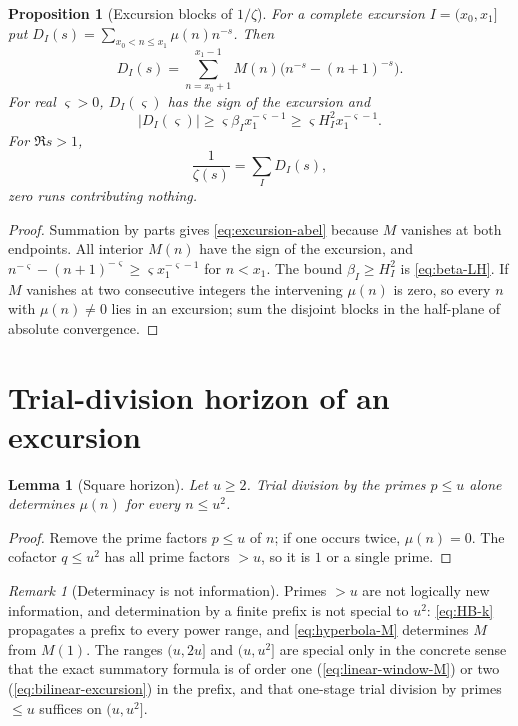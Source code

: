 \documentclass[11pt]{amsart}
\numberwithin{equation}{section}
\theoremstyle{plain}
\newtheorem{proposition}[theorem]{Proposition}
\newtheorem{lemma}[theorem]{Lemma}
\theoremstyle{definition}
\theoremstyle{remark}
\newtheorem{remark}[theorem]{Remark}
\begin{document}
\begin{proposition}[Excursion blocks of $1/\zeta$]
\label{prop:excursion-mellin}
For a complete excursion $I=(x_0,x_1]$ put
$D_I(s)=\sum_{x_0<n\le x_1}\mu(n)n^{-s}$. Then
\begin{equation}
\label{eq:excursion-abel}
D_I(s)=\sum_{n=x_0+1}^{x_1-1}M(n)
\bigl(n^{-s}-(n+1)^{-s}\bigr).
\end{equation}
For real $\varsigma>0$, $D_I(\varsigma)$ has the sign of the excursion and
\begin{equation}
\label{eq:excursion-mass-lower}
|D_I(\varsigma)|\ge
\varsigma\beta_I x_1^{-\varsigma-1}
\ge\varsigma H_I^2x_1^{-\varsigma-1}.
\end{equation}
For $\Re s>1$,
\begin{equation}
\label{eq:1overzeta-excursions}
\frac1{\zeta(s)}=\sum_I D_I(s),
\end{equation}
zero runs contributing nothing.
\end{proposition}

\begin{proof}
Summation by parts gives \eqref{eq:excursion-abel} because $M$ vanishes at
both endpoints. All interior $M(n)$ have the sign of the excursion, and
$n^{-\varsigma}-(n+1)^{-\varsigma}\ge\varsigma x_1^{-\varsigma-1}$ for $n<x_1$. The
bound $\beta_I\ge H_I^2$ is \eqref{eq:beta-LH}. If $M$ vanishes at two
consecutive integers the intervening $\mu(n)$ is zero, so every $n$ with
$\mu(n)\ne0$ lies in an excursion; sum the disjoint blocks in the
half-plane of absolute convergence.
\end{proof}

\section{Trial-division horizon of an excursion}
\label{sec:prime_horizon}

\begin{lemma}[Square horizon]
\label{lem:square-horizon}
Let $u\ge2$. Trial division by the primes $p\le u$ alone determines $\mu(n)$
for every $n\le u^2$.
\end{lemma}

\begin{proof}
Remove the prime factors $p\le u$ of $n$; if one occurs twice, $\mu(n)=0$.
The cofactor $q\le u^2$ has all prime factors $>u$, so it is $1$ or a single
prime.
\end{proof}

\begin{remark}[Determinacy is not information]
\label{rem:information}
\label{warn:information_language}
Primes $>u$ are not logically new information, and determination by a
finite prefix is not special to $u^2$: \eqref{eq:HB-k} propagates a prefix
to every power range, and \eqref{eq:hyperbola-M} determines $M$ from $M(1)$.
The ranges $(u,2u]$ and $(u,u^2]$ are special only in the concrete sense
that the exact summatory formula is of order one
(\eqref{eq:linear-window-M}) or two (\eqref{eq:bilinear-excursion}) in the
prefix, and that one-stage trial division by primes $\le u$ suffices on
$(u,u^2]$.
\end{remark}
\end{document}
